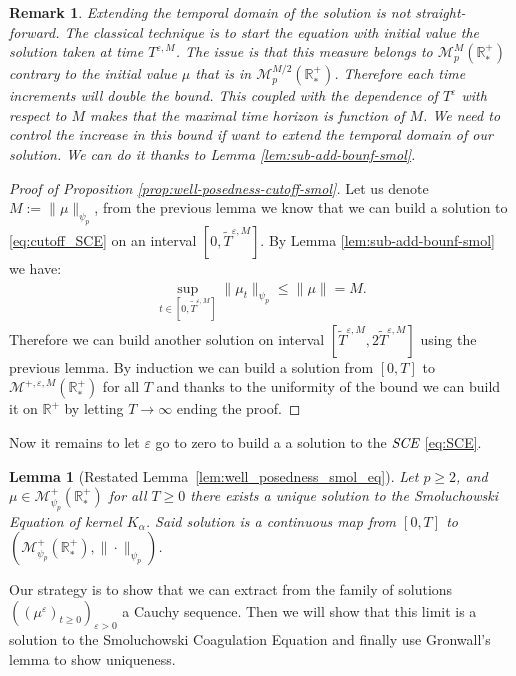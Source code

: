 \documentclass[11pt,a4paper]{article}
\newcommand{\RR}{\mathbb{R}}
\newcommand{\RRP}{\mathbb{R}^+_*}
\newcommand{\MC}{\mathcal{M}}
\newcommand{\SCE}{\emph{SCE}}
\newcommand{\Proc}[1]{\left(#1\right)_{t\geq 0}}
\newtheorem{lemma}[theorem]{Lemma}
\newtheorem{remark}[theorem]{Remark}
\begin{document}
\begin{remark}
    Extending the temporal domain of the solution is not straight-forward. The classical technique is to start the equation with initial value the solution taken at time $T^{\varepsilon,M}$. The issue is that this measure belongs to $\MC^{M}_p\left( \RRP\right)$ contrary to the initial value $\mu$ that is in $\MC^{M/2}_p\left( \RRP\right)$. Therefore each time increments will double the bound. This coupled with the dependence of $T^\varepsilon$ with respect to $M$ makes that the maximal time horizon is function of $M$. We need to control the increase in this bound if want to extend the temporal domain of our solution. We can do it thanks to Lemma \ref{lem:sub-add-bounf-smol}.
\end{remark}
\begin{proof}[Proof of Proposition \ref{prop:well-posedness-cutoff-smol}]
    Let us denote $M:= \|\mu\|_{\psi_p}$, from the previous lemma we know that we can build a solution to \eqref{eq:cutoff_SCE} on an interval $\left[0,\tilde{T}^{\varepsilon,M}\right]$. By Lemma \ref{lem:sub-add-bounf-smol} we have:
    \begin{align*}
        \sup\limits_{t \in \left[0,\tilde{T}^{\varepsilon,M}\right]} \|\mu_t\|_{\psi_p} \leq \|\mu\| = M.
    \end{align*}
    Therefore we can build another solution on interval $\left[\tilde{T}^{\varepsilon,M}, 2\tilde{T}^{\varepsilon,M}\right]$ using the previous lemma. By induction we can build a solution from $[0,T]$ to $\MC^{+,\varepsilon,M}\left(\RRP\right)$ for all $T$ and thanks to the uniformity of the bound we can build it on $\RR^{+}$ by letting $T \to \infty$ ending the proof.
\end{proof}
Now it remains to let $\varepsilon$ go to zero to build a a solution to the $\SCE$ \eqref{eq:SCE}. 
\begin{lemma}[Restated Lemma~\ref{lem:well_posedness_smol_eq}]
    Let $p \geq 2$, and $\mu \in \MC_{\psi_p}^+ (\RRP)$ for all $T \geq 0$ there exists a unique solution to the Smoluchowski Equation of kernel $K_\alpha$. Said solution is a continuous map from $[0,T]$ to $\left(\MC_{\psi_p}^+ (\RRP),\|\cdot\|_{\psi_p}\right)$.
\end{lemma}
Our strategy is to show that we can extract from the family of solutions $\left(\Proc{\mu^\varepsilon}\right)_{\varepsilon > 0}$ a Cauchy sequence. Then we will show that this limit is a solution to the Smoluchowski Coagulation Equation and finally use Gronwall's lemma to show uniqueness. 
\end{document}
